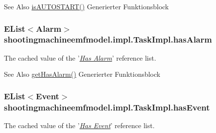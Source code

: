 \begin{DoxySeeAlso}{See Also}
\hyperlink{classshootingmachineemfmodel_1_1impl_1_1_task_impl_a21a04300417c61203bfbaa4750b93d0b}{is\-A\-U\-T\-O\-S\-T\-A\-R\-T()} Generierter Funktionsblock  
\end{DoxySeeAlso}
\hypertarget{classshootingmachineemfmodel_1_1impl_1_1_task_impl_a07d141523212532cf44121a1029725aa}{
\subsubsection[{has\-Alarm}]{\setlength{\rightskip}{0pt plus 5cm}E\-List$<${\bf Alarm}$>$ shootingmachineemfmodel.\-impl.\-Task\-Impl.\-has\-Alarm\hspace{0.3cm}{\ttfamily [protected]}}}\label{classshootingmachineemfmodel_1_1impl_1_1_task_impl_a07d141523212532cf44121a1029725aa}
The cached value of the '\hyperlink{classshootingmachineemfmodel_1_1impl_1_1_task_impl_a89dcca06c6b9120c2836ee850bd18073}{{\itshape Has Alarm}}' reference list.

\begin{DoxySeeAlso}{See Also}
\hyperlink{classshootingmachineemfmodel_1_1impl_1_1_task_impl_a89dcca06c6b9120c2836ee850bd18073}{get\-Has\-Alarm()} Generierter Funktionsblock  
\end{DoxySeeAlso}
\hypertarget{classshootingmachineemfmodel_1_1impl_1_1_task_impl_aaa5109e45db99d7301d1b741bf18a643}{
\subsubsection[{has\-Event}]{\setlength{\rightskip}{0pt plus 5cm}E\-List$<${\bf Event}$>$ shootingmachineemfmodel.\-impl.\-Task\-Impl.\-has\-Event\hspace{0.3cm}{\ttfamily [protected]}}}\label{classshootingmachineemfmodel_1_1impl_1_1_task_impl_aaa5109e45db99d7301d1b741bf18a643}
The cached value of the '\hyperlink{classshootingmachineemfmodel_1_1impl_1_1_task_impl_a7a7f8af008aa5bb195e34d29cfb0f982}{{\itshape Has Event}}' reference list.

